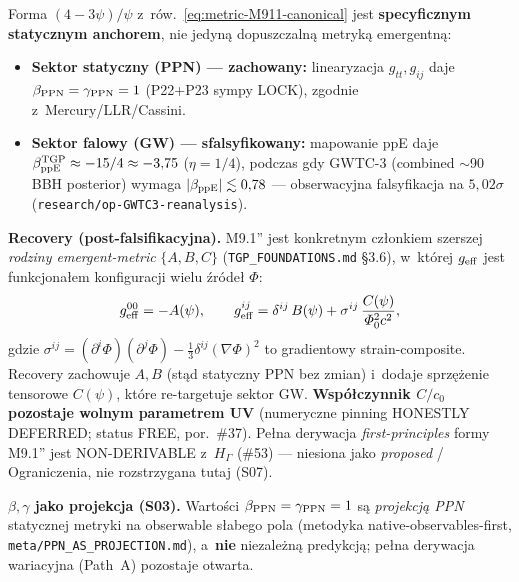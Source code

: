 \begin{remark}\label{rem:M911-GW-caveat}
Forma $(4-3\psi)/\psi$ z~r\'ow.~\eqref{eq:metric-M911-canonical}
jest \textbf{specyficznym statycznym anchorem}, nie jedyn\k{a}
dopuszczaln\k{a} metryk\k{a} emergentn\k{a}:
\begin{itemize}[nosep]
  \item \textbf{Sektor statyczny (PPN) --- zachowany:} linearyzacja
    $g_{tt},g_{ij}$ daje $\beta_{\rm PPN}=\gamma_{\rm PPN}=1$
    (P22+P23 sympy LOCK), zgodnie z~Mercury/LLR/Cassini.
  \item \textbf{Sektor falowy (GW) --- sfalsyfikowany:} mapowanie ppE
    daje $\beta_{\rm ppE}^{\rm TGP}\approx-15/4\approx-3{,}75$
    ($\eta=1/4$), podczas gdy GWTC-3 (combined $\sim$90 BBH posterior)
    wymaga $|\beta_{\rm ppE}|\lesssim0{,}78$ --- obserwacyjna
    falsyfikacja na \textbf{$5{,}02\sigma$}
    (\texttt{research/op-GWTC3-reanalysis}).
\end{itemize}
\textbf{Recovery (post-falsifikacyjna).} M9.1'' jest konkretnym
cz\l{}onkiem szerszej \emph{rodziny emergent-metric} $\{A,B,C\}$
(\texttt{TGP\_FOUNDATIONS.md} \S3.6), w~kt\'orej $g_{\rm eff}$ jest
funkcjona\l{}em konfiguracji wielu \'zr\'ode\l{} $\Phi$:
\[
  g_{\rm eff}^{00} = -A(\psi),\qquad
  g_{\rm eff}^{ij} = \delta^{ij}\,B(\psi)
    + \sigma^{ij}\,\frac{C(\psi)}{\varPhi_0^{2}c^{2}},
\]
gdzie $\sigma^{ij}=(\partial^i\Phi)(\partial^j\Phi)
-\tfrac13\delta^{ij}(\nabla\Phi)^2$ to gradientowy strain-composite.
Recovery zachowuje $A,B$ (st\k{a}d statyczny PPN bez zmian) i~dodaje
sprz\k{e}\.zenie tensorowe $C(\psi)$, kt\'ore re-targetuje sektor GW.
\textbf{Wsp\'o\l{}czynnik $C/c_0$ pozostaje wolnym parametrem UV}
(numeryczne pinning HONESTLY DEFERRED; status FREE, por.\ \#37).
Pe\l{}na derywacja \emph{first-principles} formy M9.1'' jest
NON-DERIVABLE z~$H_\Gamma$ (\#53) --- niesiona jako \emph{proposed}
/ Ograniczenia, nie rozstrzygana tutaj (S07).

\medskip\noindent
\textbf{$\beta,\gamma$ jako projekcja (S03).} Warto\'sci
$\beta_{\rm PPN}=\gamma_{\rm PPN}=1$ s\k{a} \emph{projekcj\k{a} PPN}
statycznej metryki na obserwable s\l{}abego pola (metodyka
native-observables-first, \texttt{meta/PPN\_AS\_PROJECTION.md}),
a~\textbf{nie} niezale\.zn\k{a} predykcj\k{a}; pe\l{}na derywacja
wariacyjna (Path~A) pozostaje otwarta.
\end{remark}

